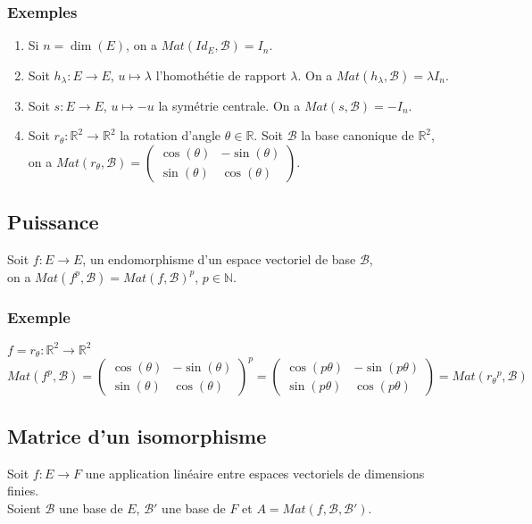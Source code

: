 \documentclass[a4paper,10pt]{book} %
\newcommand{\R}{\mathbb{R}}
\newcommand{\N}{\mathbb{N}}
\newcommand{\B}{\mathcal{B}}
\begin{document}
\subsubsection{Exemples}
\begin{enumerate}
\item Si $n=\dim(E)$, on a $Mat(Id_E,\B)=I_n$.
\item Soit $h_\lambda :E\rightarrow E$, $u\mapsto \lambda$ l'homothétie de rapport $\lambda$. On a $Mat(h_\lambda,\B)=\lambda I_n$.
\item Soit $s:E\rightarrow E$, $u\mapsto -u$ la symétrie centrale. On a $Mat(s,\B)=-I_n$.
\item Soit $r_{\theta}:\R^2\rightarrow \R^2$ la rotation d'angle $\theta\in \R$. Soit $\B$ la base canonique de $\R^2$,\\
on a $Mat(r_\theta,\B)=
\begin{pmatrix} \cos(\theta) & -\sin(\theta) \\ \sin(\theta) & \cos(\theta) \end{pmatrix}$.
\end{enumerate}

\subsection{Puissance}
Soit $f:E\rightarrow E$, un endomorphisme d'un espace vectoriel de base $\B$,\\
on a $Mat(f^p,\B)=Mat(f,\B)^p$, $p\in \N$.

\subsubsection{Exemple}
$f=r_\theta  : \R^2\rightarrow \R^2$
$Mat(f^p,\B)=\begin{pmatrix}
\cos(\theta) & -\sin(\theta) \\
\sin(\theta) & \cos(\theta)
\end{pmatrix}^p=\begin{pmatrix}
\cos(p\theta) & -\sin(p\theta) \\
\sin(p\theta) & \cos(p\theta)
\end{pmatrix}=Mat(r_\theta{}^p,\B)$

\subsection{Matrice d'un isomorphisme}
Soit $f:E\rightarrow F$ une application linéaire entre espaces vectoriels de dimensions finies.\\
Soient $\B$ une base de $E$, $\B'$ une base de $F$ et $A=Mat(f,\B,\B')$.
\end{document}
